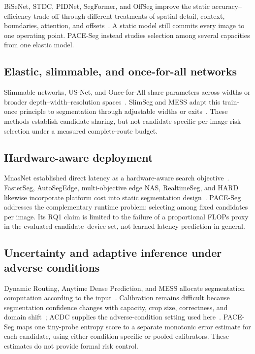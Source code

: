 \documentclass[a4paper,review,12pt]{elsarticle}
\newcommand{\method}{PACE-Seg}
\begin{document}
BiSeNet, STDC, PIDNet, SegFormer, and OffSeg improve the static accuracy--efficiency trade-off through different treatments of spatial detail, context, boundaries, attention, and offsets~\cite{yu2018bisenet,fan2021stdc,xu2023pidnet,xie2021segformer,zhang2025offseg}. A static model still commits every image to one operating point. \method{} instead studies selection among several capacities from one elastic model.

\subsection{Elastic, slimmable, and once-for-all networks}

Slimmable networks, US-Net, and Once-for-All share parameters across widths or broader depth--width--resolution spaces~\cite{yu2019slimmable,yu2019usnet,cai2020ofa}. SlimSeg and MESS adapt this train-once principle to segmentation through adjustable widths or exits~\cite{xue2022slimseg,kouris2022mess}. These methods establish candidate sharing, but not candidate-specific per-image risk selection under a measured complete-route budget.

\subsection{Hardware-aware deployment}

MnasNet established direct latency as a hardware-aware search objective~\cite{tan2019mnasnet}. FasterSeg, AutoSegEdge, multi-objective edge NAS, RealtimeSeg, and HARD likewise incorporate platform cost into static segmentation design~\cite{chen2020fasterseg,dou2023autosegedge,dou2024multiobjective,li2023realtimeseg,kwon2024hard}. \method{} addresses the complementary runtime problem: selecting among fixed candidates per image. Its RQ1 claim is limited to the failure of a proportional FLOPs proxy in the evaluated candidate--device set, not learned latency prediction in general.

\subsection{Uncertainty and adaptive inference under adverse conditions}

Dynamic Routing, Anytime Dense Prediction, and MESS allocate segmentation computation according to the input~\cite{li2020dynamic,liu2022anytime,kouris2022mess}. Calibration remains difficult because segmentation confidence changes with capacity, crop size, correctness, and domain shift~\cite{wang2023calibrating,dejorge2023reliability}; ACDC supplies the adverse-condition setting used here~\cite{sakaridis2021acdc}. \method{} maps one tiny-probe entropy score to a separate monotonic error estimate for each candidate, using either condition-specific or pooled calibrators. These estimates do not provide formal risk control.
\end{document}
